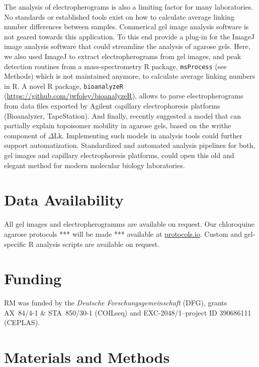 \documentclass[10pt,a4]{article}
\newcommand{\dlk}{\ensuremath{\Delta\text{Lk}}}
\newcommand{\TODO}[1]{\begingroup\color{red}*** #1 ***\endgroup}
\begin{document}
The analysis of electropherograms is also a limiting factor for many
laboratories. No standards or established tools exist on how to
calculate average linking number differences between
samples. Commerical gel image analysis software is not geared towards
this application. To this end \citet{Ziraldo2019} provide a plug-in
for the ImageJ image analysis software that could streamline the
analysis of agarose gels. Here, we also used ImageJ to extract
electropherograms from gel images, and peak detection routines from a
mass-spectrometry R package, \texttt{msProcess} (see Methods) which is
not maintained anymore, to calculate average linking numbers in R. A
novel R package, \texttt{bioanalyzeR}
(\url{https://github.com/jwfoley/bioanalyzeR}), allows to parse
electropherograms from data files exported by Agilent capillary
electrophoresis platforms (Bioanalyzer, TapeStation).
%
And finally, \citet{Vetcher2010} recently suggested a model that can
partially explain topoisomer mobility in agarose gels,
based on the writhe component of \dlk{}. Implementing such models in
analysis tools could further support automatization.  Standardized and
automated analysis pipelines for both, gel images and capillary
electrophoresis platforms, could open this old and elegant method for
modern molecular biology laboratories.



\section*{Data Availability}
All gel images and electropherogramms are available on request. Our
chloroquine agarose protocols \TODO{will be made} available at
\url{protocols.io}. Custom and gel-specific R analysis scripts are
available on request.

\section*{Funding}
RM was funded by the \textit{Deutsche Forschungsgemeinschaft} (DFG),
grants AX~84/4-1 \& STA~850/30-1 (COILseq) and EXC-2048/1--project ID
390686111 (CEPLAS).


\section{Materials and Methods}
\end{document}
